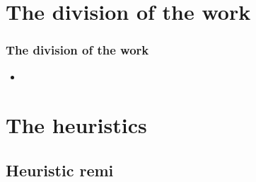 \documentclass[a4paper, 11pt]{beamer}
\begin{document}
\section{The division of the work}
\begin{frame}
\frametitle{The division of the work}
\begin{itemize}
 \item 
\end{itemize}

\end{frame}

\section{The heuristics}
\subsection{Heuristic remi}
\end{document}
